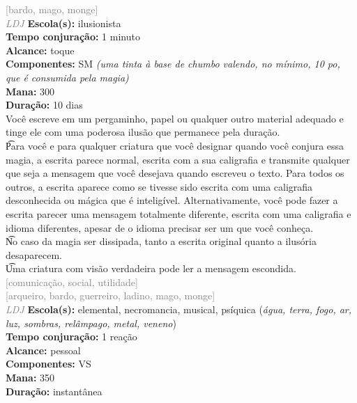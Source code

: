 \documentclass{RPG_Adventure}[2021/10/20]
\begin{document}
{\scriptsize \textcolor{gray}{[bardo, mago, monge]\\}}
{\tiny \textcolor{gray}{\textit{LDJ}}}
{\small \t \textbf{Escola(s):} ilusionista\\\t \textbf{Tempo conjuração:} 1 minuto\\\t \textbf{Alcance:} toque\\\t \textbf{Componentes:} SM \textit{(uma tinta à base de chumbo valendo, no mínimo, 10 po, que é consumida pela magia)}\\\t \textbf{Mana:} 300\\\t \textbf{Duração:} 10 dias\\}
{\normalsize Você escreve em um pergaminho, papel ou qualquer outro material adequado e tinge ele com uma poderosa ilusão que permanece pela duração.\\\t Para você e para qualquer criatura que você designar quando você conjura essa magia, a escrita parece normal, escrita com a sua caligrafia e transmite qualquer que seja a mensagem que você desejava quando escreveu o texto. Para todos os outros, a escrita aparece como se tivesse sido escrita com uma caligrafia desconhecida ou mágica que é inteligível. Alternativamente, você pode fazer a escrita parecer uma mensagem totalmente diferente, escrita com uma caligrafia e idioma diferentes, apesar de o idioma precisar ser um que você conheça.\\\t No caso da magia ser dissipada, tanto a escrita original quanto a ilusória desaparecem.\\\t Uma criatura com visão verdadeira pode ler a mensagem escondida.\\}
{\scriptsize \textcolor{gray}{[comunicação, social, utilidade]\\}}
{\scriptsize \textcolor{gray}{[arqueiro, bardo, guerreiro, ladino, mago, monge]\\}}
{\tiny \textcolor{gray}{\textit{LDJ}}}
{\small \t \textbf{Escola(s):} elemental, necromancia, musical, psíquica (\textit{água, terra, fogo, ar, luz, sombras, relâmpago, metal, veneno})\\\t \textbf{Tempo conjuração:} 1 reação\\\t \textbf{Alcance:} pessoal\\\t \textbf{Componentes:} VS\\\t \textbf{Mana:} 350\\\t \textbf{Duração:} instantânea\\}
\end{document}
